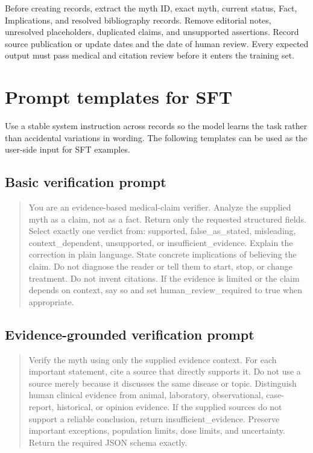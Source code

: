 \documentclass[11pt,oneside]{book}
\begin{document}
Before creating records, extract the myth ID, exact myth, current status, Fact, Implications, and resolved bibliography records. Remove editorial notes, unresolved placeholders, duplicated claims, and unsupported assertions. Record source publication or update dates and the date of human review. Every expected output must pass medical and citation review before it enters the training set.

\section{Prompt templates for SFT}

Use a stable system instruction across records so the model learns the task rather than accidental variations in wording. The following templates can be used as the user-side input for SFT examples.

\subsection{Basic verification prompt}

\begin{quote}
You are an evidence-based medical-claim verifier. Analyze the supplied myth as a claim, not as a fact. Return only the requested structured fields. Select exactly one verdict from: supported, false\_as\_stated, misleading, context\_dependent, unsupported, or insufficient\_evidence. Explain the correction in plain language. State concrete implications of believing the claim. Do not diagnose the reader or tell them to start, stop, or change treatment. Do not invent citations. If the evidence is limited or the claim depends on context, say so and set human\_review\_required to true when appropriate.
\end{quote}

\subsection{Evidence-grounded verification prompt}

\begin{quote}
Verify the myth using only the supplied evidence context. For each important statement, cite a source that directly supports it. Do not use a source merely because it discusses the same disease or topic. Distinguish human clinical evidence from animal, laboratory, observational, case-report, historical, or opinion evidence. If the supplied sources do not support a reliable conclusion, return insufficient\_evidence. Preserve important exceptions, population limits, dose limits, and uncertainty. Return the required JSON schema exactly.
\end{quote}
\end{document}
